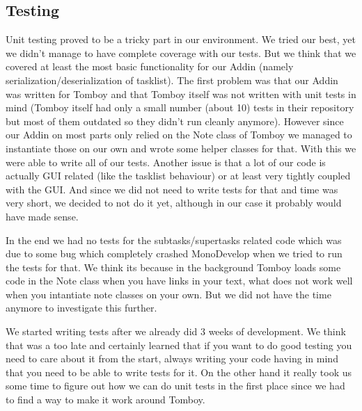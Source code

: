 \subsection{Testing}
\label{testing}
Unit testing proved to be a tricky part in our environment. We tried our best, yet we didn't manage to have complete coverage with our tests. But we think that we covered at least the most basic functionality for our Addin (namely serialization/deserialization of tasklist).
The first problem was that our Addin was written for Tomboy and that Tomboy itself was not written with unit tests in mind (Tomboy itself had only a small number (about 10) tests in their repository but most of them outdated so they didn't run cleanly anymore). However since our Addin on most parts only relied on the Note class of Tomboy we managed to instantiate those on our own and wrote some helper classes for that. With this we were able to write all of our tests.
Another issue is that a lot of our code is actually GUI related (like the tasklist behaviour) or at least very tightly coupled with the GUI. And since we did not need to write tests for that and time was very short, we decided to not do it yet, although in our case it probably would have made sense.

In the end we had no tests for the subtasks/supertasks related code which was due to some bug which completely crashed MonoDevelop when we tried to run the tests for that. We think its because in the background Tomboy loads some code in the Note class when you have links in your text, what does not work well when you intantiate note classes on your own. But we did not have the time anymore to investigate this further.

We started writing tests after we already did 3 weeks of development. We think that was a too late and certainly learned that if you want to do good testing you need to care about it from the start, always writing your code having in mind that you need to be able to write tests for it. On the other hand it really took us some time to figure out how we can do unit tests in the first place since we had to find a way to make it work around Tomboy.